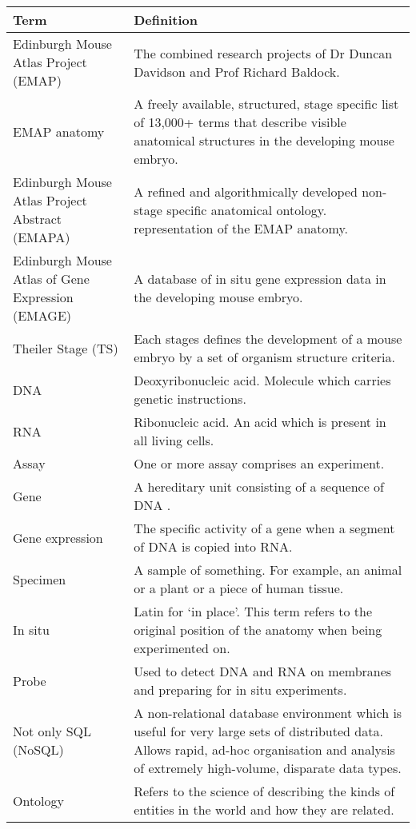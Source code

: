 \begin{center}
    \begin{tabular}{ |p{0.3\linewidth} | p{0.7\linewidth} |}
    \hline
    \textbf{Term} & \textbf{Definition} \\ \hline
    Edinburgh Mouse Atlas Project (EMAP) & The combined research projects of Dr Duncan Davidson and Prof Richard Baldock. \\ \hline
    EMAP anatomy & A freely available, structured, stage specific list of 13,000+ terms that describe visible anatomical structures in the developing mouse embryo. \\ \hline
    Edinburgh Mouse Atlas Project Abstract (EMAPA) & A refined and algorithmically developed non-stage specific anatomical ontology. representation of the EMAP anatomy. \\ \hline
    Edinburgh Mouse Atlas of Gene Expression (EMAGE) & A database of in situ gene expression data in the developing mouse embryo.  \\ \hline
    Theiler Stage (TS) & Each stages defines the development of a mouse embryo by a set of organism structure criteria. \\ \hline
    DNA & Deoxyribonucleic acid. Molecule which carries genetic instructions. \\ \hline
    RNA & Ribonucleic acid. An acid which is present in all living cells.  \\ \hline
    Assay & One or more assay comprises an experiment. \\ \hline
    Gene & A hereditary unit consisting of a sequence of DNA \cite{emap}. \\ \hline
    Gene expression & The specific activity of a gene when a segment of DNA is copied into RNA. \\ \hline
    Specimen &  A sample of something. For example, an animal or a plant or a piece of human tissue.\\ \hline
    In situ & Latin for `in place'. This term refers to the original position of the anatomy when being experimented on. \\ \hline
    Probe & Used to detect DNA and RNA on membranes and preparing for in situ experiments. \\ \hline
    Not only SQL (NoSQL) & A non-relational database environment which is useful for very large sets of distributed data. Allows rapid, ad-hoc organisation and analysis of extremely high-volume, disparate data types. \\ \hline
        Ontology & Refers to the science of describing the kinds of entities in the world and how they are related. \\ \hline
    \end{tabular}
\end{center}
\clearpage{}\setcounter{page}{1}